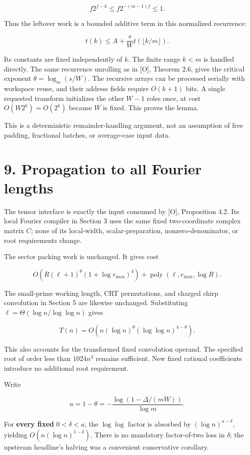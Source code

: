\documentclass[
  11pt,
  letterpaper,
]{article}
\begin{document}
\[
f2^{f-k}\le f2^{-(m-1)f}\le1.
\]

Thus the leftover work is a bounded additive term in this normalized
recurrence:

\[
\boxed{t(k)\le A+\frac{s}{W}t(\lfloor k/m\rfloor).}
\]

Its constants are fixed independently of \(k\). The finite range \(k<m\)
is handled directly. The same recurrence unrolling as in {[}O{]},
Theorem 2.6, gives the critical exponent \(\theta=\log_m(s/W)\). The
recursive arrays can be processed serially with workspace reuse, and
their address fields require \(O(k+1)\) bits. A single requested
transform initializes the other \(W-1\) roles once, at cost
\(O(W2^k)=O(2^k)\) because \(W\) is fixed. This proves the lemma.

This is a deterministic remainder-handling argument, not an assumption
of free padding, fractional batches, or average-case input data.

\section{9. Propagation to all Fourier
lengths}\label{propagation-to-all-fourier-lengths}

The tensor interface is exactly the input consumed by {[}O{]},
Proposition 4.2. Its local Fourier compiler in Section 3 uses the same
fixed two-coordinate complex matrix \(C\); none of its local-width,
scalar-preparation, nonzero-denominator, or root requirements change.

The sector packing work is unchanged. It gives cost

\[
O\!\left(R(\ell+1)^\theta(1+\log r_{\max})^4\right)
+\operatorname{poly}(\ell,r_{\max},\log R).
\]

The small-prime working length, CRT permutations, and charged chirp
convolution in Section 5 are likewise unchanged. Substituting
\(\ell=\Theta(\log n/\log\log n)\) gives

\[
\boxed{T(n)=O\!\left(n(\log n)^\theta(\log\log n)^{4-\theta}\right).}
\]

This also accounts for the transformed fixed convolution operand. The
specified root of order less than \(1024 n^3\) remains sufficient. New
fixed rational coefficients introduce no additional root requirement.

Write

\[
a=1-\theta=-\frac{\log(1-\Delta/(mW))}{\log m}.
\]

For \textbf{every fixed} \(0<\delta<a\), the \(\log\log\) factor is
absorbed by \((\log n)^{a-\delta}\), yielding
\(O(n(\log n)^{1-\delta})\). There is no mandatory factor-of-two loss in
\(\delta\); the upstream headline's halving was a convenient
conservative corollary.
\end{document}
